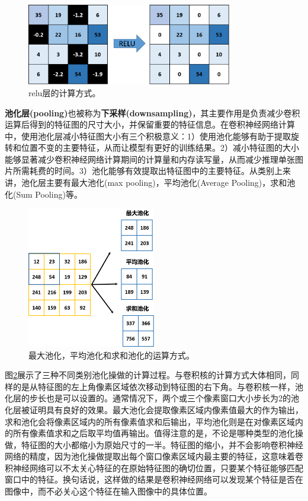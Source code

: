 \begin{figure}[ht]
	\centering
	\includegraphics[width=0.8\textwidth]{figures/relu.png}
	\caption{relu层的计算方式。}
	\label{relu}
\end{figure}

\textbf{池化层(pooling)}也被称为\textbf{下采样(downsampling)}，其主要作用是负责减少卷积运算后得到的特征图的尺寸大小，并保留重要的特征信息。在卷积神经网络计算中，使用池化层减小特征图大小有三个积极意义：1）使用池化能够有助于提取旋转和位置不变的主要特征，从而让模型有更好的训练结果。2）减小特征图的大小能够显著减少卷积神经网络计算期间的计算量和内存读写量，从而减少推理单张图片所需耗费的时间。3）池化能够有效提取出特征图中的主要特征。从类别上来讲，池化层主要有最大池化(max pooling)，平均池化(Average Pooling)，求和池化(Sum Pooling)等。

\begin{figure}[ht]
	\centering
	\includegraphics[width=0.5\textwidth]{figures/pooling.png}
	\caption{最大池化，平均池化和求和池化的运算方式。}
	\label{pooling}
\end{figure}

图\ref{pooling}展示了三种不同类别池化操做的计算过程。与卷积核的计算方式大体相同，同样的是从特征图的左上角像素区域依次移动到特征图的右下角。与卷积核一样，池化层的步长也是可以设置的。通常情况下，两个或三个像素窗口大小步长为2的池化层被证明具有良好的效果。最大池化会提取像素区域内像素值最大的作为输出，求和池化会将像素区域内的所有像素值求和后输出，平均池化则是在对像素区域内的所有像素值求和之后取平均值再输出。值得注意的是，不论是哪种类型的池化操做，特征图的大小都缩小为原始尺寸的一半。特征图的缩小，并不会影响卷积神经网络的精度，因为池化操做提取出每个窗口像素区域内最主要的特征，这意味着卷积神经网络可以不太关心特征的在原始特征图的确切位置，只要某个特征能够匹配窗口中的特征。换句话说，这样做的结果是卷积神经网络可以发现某个特征是否在图像中，而不必关心这个特征在输入图像中的具体位置。

